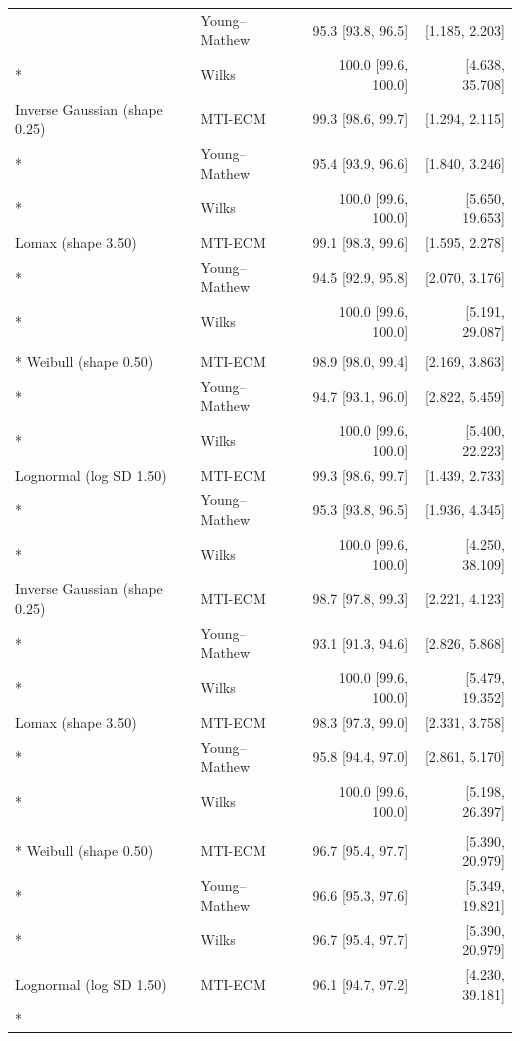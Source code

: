 \begin{longtable}{@{}llrr@{}}
 & Young--Mathew & 95.3 [93.8, 96.5] & [1.185, 2.203] \\*
 & Wilks & 100.0 [99.6, 100.0] & [4.638, 35.708] \\
Inverse Gaussian (shape 0.25) & MTI-ECM & 99.3 [98.6, 99.7] & [1.294, 2.115] \\*
 & Young--Mathew & 95.4 [93.9, 96.6] & [1.840, 3.246] \\*
 & Wilks & 100.0 [99.6, 100.0] & [5.650, 19.653] \\
Lomax (shape 3.50) & MTI-ECM & 99.1 [98.3, 99.6] & [1.595, 2.278] \\*
 & Young--Mathew & 94.5 [92.9, 95.8] & [2.070, 3.176] \\*
 & Wilks & 100.0 [99.6, 100.0] & [5.191, 29.087] \\
\addlinespace[0.4em]
\multicolumn{4}{l}{\textbf{\(n=500, c=0.95, p=0.95\)}} \\*
Weibull (shape 0.50) & MTI-ECM & 98.9 [98.0, 99.4] & [2.169, 3.863] \\*
 & Young--Mathew & 94.7 [93.1, 96.0] & [2.822, 5.459] \\*
 & Wilks & 100.0 [99.6, 100.0] & [5.400, 22.223] \\
Lognormal (log SD 1.50) & MTI-ECM & 99.3 [98.6, 99.7] & [1.439, 2.733] \\*
 & Young--Mathew & 95.3 [93.8, 96.5] & [1.936, 4.345] \\*
 & Wilks & 100.0 [99.6, 100.0] & [4.250, 38.109] \\
Inverse Gaussian (shape 0.25) & MTI-ECM & 98.7 [97.8, 99.3] & [2.221, 4.123] \\*
 & Young--Mathew & 93.1 [91.3, 94.6] & [2.826, 5.868] \\*
 & Wilks & 100.0 [99.6, 100.0] & [5.479, 19.352] \\
Lomax (shape 3.50) & MTI-ECM & 98.3 [97.3, 99.0] & [2.331, 3.758] \\*
 & Young--Mathew & 95.8 [94.4, 97.0] & [2.861, 5.170] \\*
 & Wilks & 100.0 [99.6, 100.0] & [5.198, 26.397] \\
\addlinespace[0.4em]
\multicolumn{4}{l}{\textbf{\(n=500, c=0.99, p=0.95\)}} \\*
Weibull (shape 0.50) & MTI-ECM & 96.7 [95.4, 97.7] & [5.390, 20.979] \\*
 & Young--Mathew & 96.6 [95.3, 97.6] & [5.349, 19.821] \\*
 & Wilks & 96.7 [95.4, 97.7] & [5.390, 20.979] \\
Lognormal (log SD 1.50) & MTI-ECM & 96.1 [94.7, 97.2] & [4.230, 39.181] \\*

\end{longtable}
